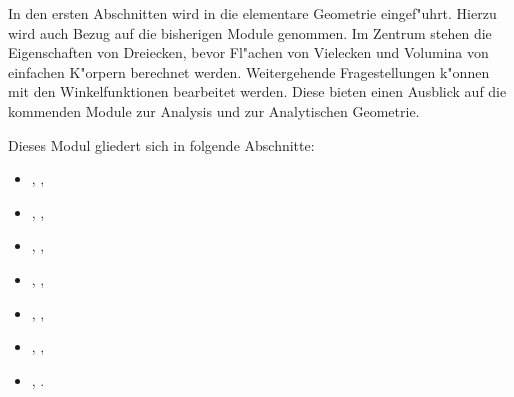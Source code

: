 

\Mtikzexternalize

\MSetSubject{\MINTMathematics}




\begin{MSectionStart}

In den ersten Abschnitten wird in die elementare Geometrie eingef"uhrt. 
Hierzu wird auch Bezug auf die bisherigen Module genommen. Im Zentrum stehen 
die Eigenschaften von Dreiecken, bevor Fl"achen von Vielecken und Volumina 
von einfachen K"orpern berechnet werden.
Weitergehende Fragestellungen k"onnen mit den Winkelfunktionen bearbeitet
werden. Diese bieten einen Ausblick auf die kommenden Module zur Analysis
und zur Analytischen Geometrie.

Dieses Modul gliedert sich in folgende Abschnitte:

\begin{itemize}
\item{, ,}
\item{, ,}
\item{, ,}
\item{, ,}
\item{, ,}
\item{, ,}
\item{, .}
\end{itemize}

\end{MSectionStart}

\newcommand{\MGeoAbstand}[2]{\ensuremath{[\overline{#1#2}]}}
\newcommand{\MGeoGerade}[2]{\ensuremath{#1#2}}
\newcommand{\MGeoStrecke}[2]{\ensuremath{\overline{#1#2}}}

\newcommand{\MGeoDreieck}[3]{\ensuremath{#1#2#3}}



